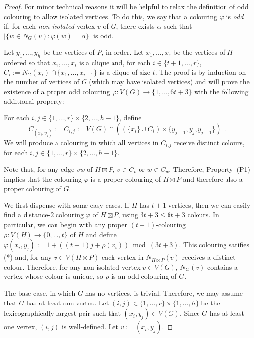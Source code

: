 \documentclass{patmorin}
\begin{document}
\begin{proof}
  For minor technical reasons it will be helpful to relax the definition of odd colouring to allow isolated vertices.  To do this, we say that a colouring $\varphi$ is \emph{odd} if, for each \emph{non-isolated} vertex $v$ of $G$, there exists $\alpha$ such that $|\{w\in N_G(v):\varphi(w)=\alpha\}|$ is odd.

  Let $y_1,\ldots,y_h$ be the vertices of $P$, in order.  Let $x_1,\ldots,x_r$ be the vertices of $H$ ordered so that $x_1,\ldots,x_{t}$ is a clique and, for each $i\in\{t+1,\ldots,r\}$, $C_i:=N_G(x_i)\cap\{x_1,\ldots,x_{i-1}\}$ is a clique of size $t$.  The proof is by induction on the number of vertices of $G$ (which may have isolated vertices) and will prove the existence of a proper odd colouring $\varphi:V(G)\to\{1,\ldots,6t+3\}$ with the following additional property:
  \begin{compactitem}[(*)]
    \item For each $i,j\in\{1,\ldots,r\}\times \{2,\ldots,h-1\}$, define
    \[
      C_{(x_i,y_j)}:=C_{i,j}:=V(G)\cap ((\{x_i\}\cup C_i)\times\{y_{j-1}, y_{j},y_{j+1}\})
      \enspace .
    \]
    We will produce a colouring in which all vertices in $C_{i,j}$ receive distinct colours, for each $i,j\in\{1,\ldots,r\}\times\{2,\ldots,h-1\}$.
  \end{compactitem}
  Note that, for any edge $vw$ of $H\boxtimes P$, $v \in C_v$ or $w\in C_w$.  Therefore, Property~(P1) implies that the colouring $\varphi$ is a proper colouring of $H\boxtimes P$ and therefore also a proper colouring of $G$.


  We first dispense with some easy cases.  If $H$ has $t+1$ vertices, then we can easily find a distance-$2$ colouring $\varphi$ of $H\boxtimes P$, using $3t+3\le 6t+3$ colours. In particular, we can begin with any proper $(t+1)$-colouring $\rho:V(H)\to\{0,\ldots,t\}$ of $H$ and define $\varphi(x_i,y_j):=1+((t+1)j + \rho(x_i))\bmod (3t+3)$.  This colouring satifies (*) and, for any $v\in V(H\boxtimes P)$ each vertex in $N_{H\boxtimes P}(v)$ receives a distinct colour.  Therefore, for any non-isolated vertex $v\in V(G)$, $N_G(v)$ contains a vertex whose colour is unique, so $\rho$ is an odd colouring of $G$.

  The base case, in which $G$ has no vertices, is trivial. Therefore, we may assume that $G$ has at least one vertex.  Let $(i,j)\in\{1,\ldots,r\}\times\{1,\ldots,h\}$ be the lexicographically largest pair such that $(x_i,y_j)\in V(G)$.  Since $G$ has at least one vertex, $(i,j)$ is well-defined.  Let $v:=(x_i,y_j)$.


\end{proof}
\end{document}
